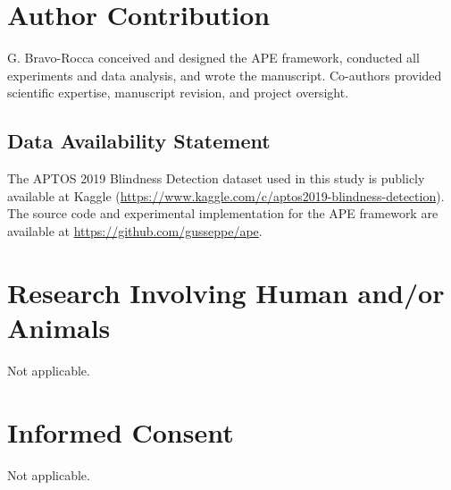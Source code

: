 \documentclass[pdflatex,sn-mathphys-num]{sn-jnl}%
\theoremstyle{thmstyleone}%
\theoremstyle{thmstyletwo}%
\theoremstyle{thmstylethree}%
\begin{document}
\section*{Author Contribution}
G. Bravo-Rocca conceived and designed the APE framework, conducted all experiments and data analysis, and wrote the manuscript. Co-authors provided scientific expertise, manuscript revision, and project oversight.

\subsection*{Data Availability Statement}
The APTOS 2019 Blindness Detection dataset used in this study is publicly available at Kaggle (\url{https://www.kaggle.com/c/aptos2019-blindness-detection}). The source code and experimental implementation for the APE framework are available at \url{https://github.com/gusseppe/ape}. 


\section*{Research Involving Human and/or Animals}
Not applicable.

\section*{Informed Consent}
Not applicable.





\end{document}
